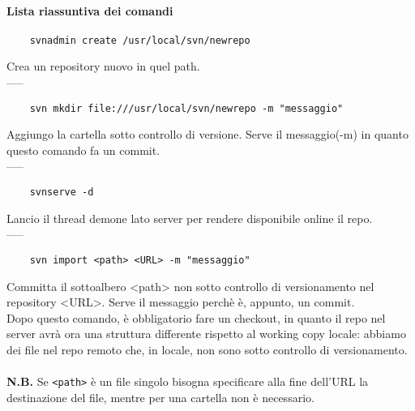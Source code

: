 \documentclass[a4paper]{article}
\begin{document}
	\paragraph{Lista riassuntiva dei comandi\\}
	\begin{verbatim}
	svnadmin create /usr/local/svn/newrepo
	\end{verbatim}
	Crea un repository nuovo in quel path.\\-----
	\begin{verbatim}
	svn mkdir file:///usr/local/svn/newrepo -m "messaggio"
	\end{verbatim}
	Aggiungo la cartella sotto controllo di versione. Serve il messaggio(-m) in quanto questo comando fa un commit.\\-----
	\begin{verbatim}
	svnserve -d
	\end{verbatim}
	Lancio il thread demone lato server per rendere disponibile online il repo.\\-----
	\begin{verbatim}
	svn import <path> <URL> -m "messaggio"
	\end{verbatim} 
	Committa il sottoalbero <path> non sotto controllo di versionamento nel repository <URL>. Serve il messaggio perchè è, appunto, un commit.\\
	Dopo questo comando, è obbligatorio fare un checkout, in quanto il repo nel server avrà ora una struttura differente rispetto al working copy locale: 
	abbiamo dei file nel repo remoto che, in locale, non sono sotto controllo di versionamento.\\
	\\
	\textbf{N.B.} Se \verb|<path>| è un file singolo bisogna specificare alla fine dell'URL la destinazione del file, mentre
	per una cartella non è necessario.
	
\end{document}
